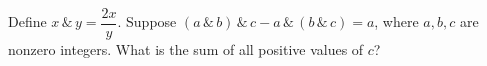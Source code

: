 Define $x\,\&\,y=\dfrac{2x}{y}$. Suppose $(a\,\&\,b)\,\&\,c-a\,\&\,(b\,\&\,c)=a$, where $a,b,c$ are nonzero integers. What is the sum of all positive values of $c$?
